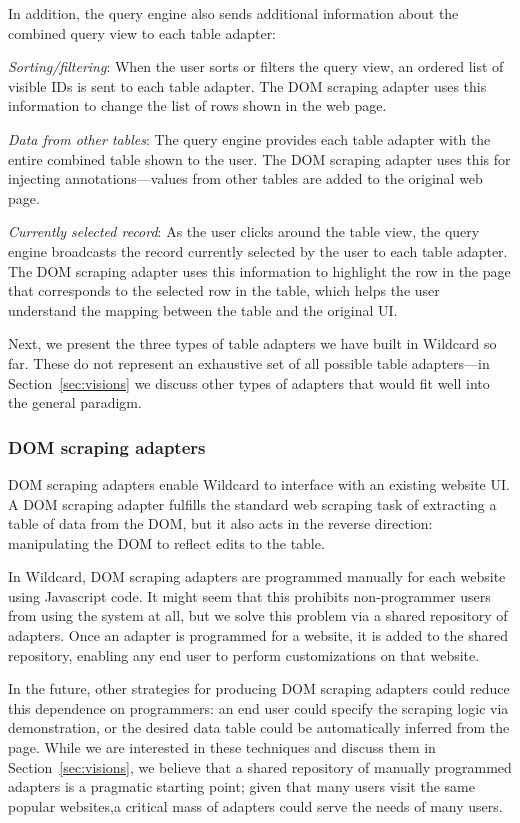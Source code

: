 \documentclass[sigplan,screen,10pt,anonymous,review]{acmart}
\begin{document}
In addition, the query engine also sends additional information about
the combined query view to each table adapter:

\emph{Sorting/filtering}: When the user sorts or filters the query view,
an ordered list of visible IDs is sent to each table adapter. The DOM
scraping adapter uses this information to change the list of rows shown
in the web page.

\emph{Data from other tables}: The query engine provides each table
adapter with the entire combined table shown to the user. The DOM
scraping adapter uses this for injecting annotations---values from other
tables are added to the original web page.

\emph{Currently selected record}: As the user clicks around the table
view, the query engine broadcasts the record currently selected by the
user to each table adapter. The DOM scraping adapter uses this
information to highlight the row in the page that corresponds to the
selected row in the table, which helps the user understand the mapping
between the table and the original UI.

Next, we present the three types of table adapters we have built in
Wildcard so far. These do not represent an exhaustive set of all
possible table adapters---in Section~\ref{sec:visions} we discuss other
types of adapters that would fit well into the general paradigm.

\hypertarget{dom-scraping-adapters}{%
\subsubsection{DOM scraping adapters}\label{dom-scraping-adapters}}

DOM scraping adapters enable Wildcard to interface with an existing
website UI. A DOM scraping adapter fulfills the standard web scraping
task of extracting a table of data from the DOM, but it also acts in the
reverse direction: manipulating the DOM to reflect edits to the table.

In Wildcard, DOM scraping adapters are programmed manually for each
website using Javascript code. It might seem that this prohibits
non-programmer users from using the system at all, but we solve this
problem via a shared repository of adapters. Once an adapter is
programmed for a website, it is added to the shared repository, enabling
any end user to perform customizations on that website.

In the future, other strategies for producing DOM scraping adapters
could reduce this dependence on programmers: an end user could specify
the scraping logic via demonstration, or the desired data table could be
automatically inferred from the page. While we are interested in these
techniques and discuss them in Section~\ref{sec:visions}, we believe
that a shared repository of manually programmed adapters is a pragmatic
starting point; given that many users visit the same popular websites,a
critical mass of adapters could serve the needs of many users.
\end{document}
